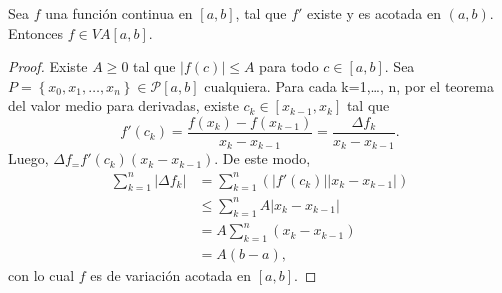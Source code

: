 \begin{lemma}

Sea $f$ una función continua en $\left[a,b\right]$, tal que $f'$ existe y es acotada en $\left(a,b\right)$. Entonces $f\in VA\left[a,b\right]$.

\end{lemma}

\begin{proof}

Existe $A\geq 0$ tal que $|f\left(c\right)| \leq A$ para todo $c \in \left[a,b\right]$. Sea $P= \left\lbrace x_0, x_1, \dots, x_n \right\rbrace \in \mathcal{P}\left[a,b\right]$ cualquiera. Para cada k=1,\dots, n, por el teorema del valor medio para derivadas, existe $c_k\in \left[x_{k-1},x_k\right]$ tal que 
\begin{equation*}
  f'\left(c_k\right)=\frac{f\left(x_k\right)-f\left(x_{k-1}\right)}{x_k-x_{k-1}}=\frac{\Delta f_k}{x_k-x_{k-1}}.
\end{equation*}
Luego, $\Delta f_ = f'\left(c_k\right)\left(x_k-x_{k-1}\right)$. De este modo,
\begin{align*}
  \sum_{k=1}^{n}|\Delta f_{k}|&=\sum_{k=1}^{n}\left(|f'\left(c_k\right)||x_k-x_{k-1}|\right)\\
  &\leq \sum_{k=1}^{n}A|x_k-x_{k-1}|\\
  &=A\sum_{k=1}^{n}\left(x_k-x_{k-1}\right)\\
  &=A\left(b-a\right),
\end{align*}
con lo cual $f$ es de variación acotada en $\left[a,b\right]$.

\end{proof}

